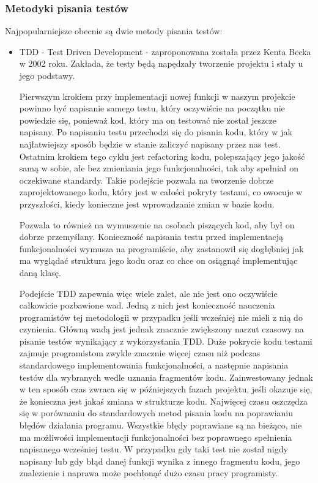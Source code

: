 \subsubsection{Metodyki pisania testów}
\par Najpopularniejsze obecnie są dwie metody pisania testów: 
\begin{itemize}
    \item TDD - Test Driven Development - zaproponowana została przez Kenta Becka w 2002 roku. \cite{TestDrivenDevelopment} Zakłada, że testy będą napędzały tworzenie projektu i stały u jego podstawy. 
    \par Pierwszym krokiem przy implementacji nowej funkcji w naszym projekcie powinno być napisanie samego testu, który oczywiście na początku nie powiedzie się, ponieważ kod, który ma on testować nie został jeszcze napisany. Po napisaniu testu przechodzi się do pisania kodu, który w jak najłatwiejszy sposób będzie w stanie zaliczyć napisany przez nas test. Ostatnim krokiem tego cyklu jest refactoring kodu, polepszający jego jakość samą w sobie, ale bez zmieniania jego funkcjonalności, tak aby spełniał on oczekiwane standardy.
    Takie podejście pozwala na tworzenie dobrze zaprojektowanego kodu, który jest w całości pokryty testami, co owocuje w przyszłości, kiedy konieczne jest wprowadzanie zmian w bazie kodu.
    
    Pozwala to również na wymuszenie na osobach piszących kod, aby był on dobrze przemyślany. Konieczność napisania testu przed implementacją funkcjonalności wymusza na programiście, aby zastanowił się dogłębniej jak ma wyglądać struktura jego kodu oraz co chce on osiągnąć implementując daną klasę. 
    
    Podejście TDD zapewnia więc wiele zalet, ale nie jest ono oczywiście całkowicie pozbawione wad. Jedną z nich jest konieczność nauczenia programistów tej metodologii w przypadku jeśli wcześniej nie mieli z nią do czynienia. Główną wadą jest jednak znacznie zwiększony narzut czasowy na pisanie testów wynikający z wykorzystania TDD. Duże pokrycie kodu testami zajmuje programistom zwykle znacznie więcej czasu niż podczas standardowego implementowania funkcjonalności, a następnie napisania testów dla wybranych wedle uznania fragmentów kodu. Zainwestowany jednak w ten sposób czas zwraca się w późniejszych fazach projektu, jeśli okazuje się, że konieczna jest jakaś zmiana w strukturze kodu. Najwięcej czasu oszczędza się w porównaniu do standardowych metod pisania kodu na poprawianiu błędów działania programu. Wszystkie błędy poprawiane są na bieżąco, nie ma możliwości implementacji funkcjonalności bez poprawnego spełnienia napisanego wcześniej testu. W przypadku gdy taki test nie został nigdy napisany lub gdy błąd danej funkcji wynika z innego fragmentu kodu, jego znalezienie i naprawa może pochłonąć dużo czasu pracy programisty. 
    

\end{itemize}
